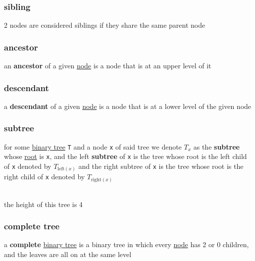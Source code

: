 \documentclass[a4paper,12pt]{article}
\begin{document}
\subsubsection{sibling}
\label{sec:org74ef367}
\begin{definition}
2 nodes are considered siblings if they share the same parent node\\[0pt]
\end{definition}
\subsubsection{ancestor}
\label{sec:org48e7ebc}
\begin{definition}
an \textbf{ancestor} of a given \hyperref[sec:orgec4976f]{node} is a node that is at an upper level of it\\[0pt]
\end{definition}
\subsubsection{descendant}
\label{sec:org3e6c055}
\begin{definition}
a \textbf{descendant} of a given \hyperref[sec:orgec4976f]{node} is a node that is at a lower level of the given node\\[0pt]
\end{definition}
\subsubsection{subtree}
\label{sec:orgaaf7b83}
for some \hyperref[sec:org254f5f7]{binary tree} \texttt{T} and a node \texttt{x} of said tree we denote \(T_x\) as the \textbf{subtree} whose \hyperref[sec:org76387eb]{root} is \texttt{x}, and the left \textbf{subtree} of \texttt{x} is the tree whose root is the left child of \texttt{x} denoted by \(T_{\text{left}(x)}\) and the right subtree of \texttt{x} is the tree whose root is the right child of \texttt{x} denoted by \(T_{\text{right}(x)}\)\\[0pt]

\begin{center}

\end{center}\\[0pt]

the height of this tree is 4\\[0pt]
\subsubsection{complete tree}
\label{sec:org8d4eeb6}
\begin{definition}
a \textbf{complete} \hyperref[sec:org254f5f7]{binary tree} is a binary tree in which every \hyperref[sec:orgec4976f]{node} has 2 or 0 children, and the leaves are all on at the same level\\[0pt]
\end{definition}
\end{document}
